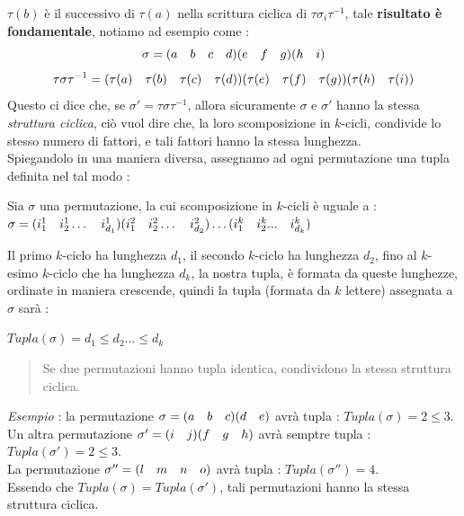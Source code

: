 \documentclass[12pt, letterpaper]{article}
\newcommand{\spaz}{{\text{\hphantom{aa}}}}
\begin{document}
\(\tau(b)\) è il successivo di \(\tau(a)\) nella scrittura ciclica di \(\tau\sigma_i\tau^{-1}\), tale \textbf{risultato 
è fondamentale}, notiamo ad esempio come : 
\begin{equation}
    \sigma = (a\spaz b\spaz c\spaz d)(e\spaz f\spaz g)(h\spaz i)
\end{equation}
\begin{equation}
    \tau\sigma\tau^{-1} = (\tau(a)\spaz \tau(b)\spaz \tau(c)\spaz \tau(d))(\tau(e)\spaz \tau(f)\spaz \tau(g))(\tau(h)\spaz \tau(i))
\end{equation}
Questo ci dice che, se \(\sigma'=\tau\sigma\tau^{-1}\), allora sicuramente \(\sigma\) e 
\(\sigma'\) hanno la stessa \textit{struttura ciclica}, ciò vuol dire che, la loro 
scomposizione in \(k\)-cicli, condivide lo stesso numero di fattori, e tali fattori hanno la stessa lunghezza. \\
Spiegandolo in una maniera diversa, assegnamo ad ogni permutazione una tupla definita nel tal modo :
\begin{center}
    Sia \(\sigma\) una permutazione, la cui scomposizione in \(k\)-cicli è uguale a : \\ 
    \(\sigma=(i^1_1\spaz i^1_2\dots\spaz i^1_{d_1})(i^2_1\spaz i^2_2\dots\spaz i^2_{d_2})\dots(i^k_1\spaz i^k_2...\spaz i^k_{d_k})\)
\end{center}
Il primo \(k\)-ciclo ha lunghezza \(d_1\), il secondo \(k\)-ciclo ha lunghezza \(d_2\), fino al \(k\)-esimo 
\(k\)-ciclo che ha lunghezza \(d_k\), la nostra tupla, è formata da queste lunghezze, ordinate in maniera 
crescende, quindi la tupla (formata da \(k\) lettere) assegnata a \(\sigma\) sarà :\begin{center}
    \(Tupla(\sigma)=d_1\le d_2\dots\le d_k\)
\end{center}
\begin{quote}
    
    Se due permutazioni hanno tupla identica, condividono la stessa struttura ciclica.
\end{quote}
\textit{Esempio} : la permutazione \(\sigma=(a\spaz b\spaz c)(d\spaz e)\) avrà tupla : \(Tupla(\sigma)=2\le3\).\\
Un altra permutazione \(\sigma'=(i\spaz j)(f\spaz g\spaz h)\) avrà semptre tupla : \(Tupla(\sigma')=2\le3\).\\
La permutazione \(\sigma''=(l\spaz m\spaz n\spaz o)\) avrà tupla : \(Tupla(\sigma'')=4\).\\
Essendo che \(Tupla(\sigma)=Tupla(\sigma')\), tali permutazioni hanno la stessa struttura ciclica.
\end{document}
